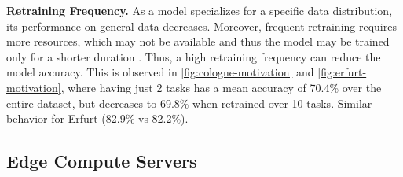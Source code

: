 \textbf{Retraining Frequency.} As a model specializes for a specific data distribution, its performance on general data decreases.  Moreover, frequent retraining requires more resources, which may not be available and thus the model may be trained only for a shorter duration . Thus, a high retraining frequency can reduce the model accuracy.
This is observed in \cref{fig:cologne-motivation} and \cref{fig:erfurt-motivation}, where having just 2 tasks  has a mean accuracy of 70.4\% over the entire dataset, but decreases to 69.8\% when retrained over 10 tasks. Similar behavior for Erfurt (82.9\% vs 82.2\%). 




\subsection{Edge Compute Servers}
\label{subsec:edge}


